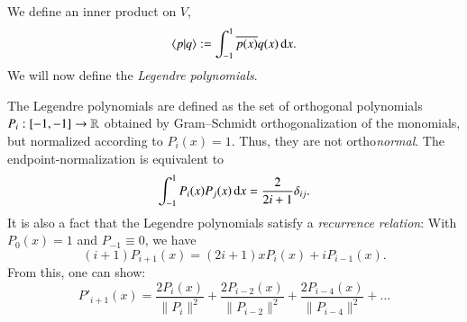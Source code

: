 \documentclass[12pt]{report}
\newenvironment{solution}%
        {%
            \ifthenelse{\isundefined{\showsolutions}}%
                    {\expandafter\comment}%
                    {\begin{mySolution}{}{}}%
                    }%
         {%
            \ifthenelse{\isundefined{\showsolutions}}%
                    {\expandafter\endcomment}%
                    {\end{mySolution}}%
          }
\begin{document}
We define an inner product on $V$,
\begin{equation}
    \braket{p|q} := \int_{-1}^1 \overline{p(x)} q(x) \, \mathrm{d} x.
\end{equation}
We will now define the \emph{Legendre polynomials}.
The Legendre polynomials  are defined as the set of orthogonal polynomials $P_i : [-1,-1]\to \mathbb{R}$ obtained by Gram--Schmidt orthogonalization of the monomials, but normalized according to $P_i(x) = 1$. Thus, they are not ortho\emph{normal}. The endpoint-normalization is equivalent to
\begin{equation}
    \int_{-1}^1 P_i(x) P_j(x) \, \mathrm{d} x = \frac{2}{2i + 1} \delta_{ij}.
\end{equation}
It is also a fact that the Legendre polynomials satisfy a \emph{recurrence relation}: With $P_0(x) = 1$ and $P_{-1} \equiv 0$, we have
\begin{equation}
    (i + 1) P_{i+1}(x) = (2i + 1) x P_i(x) + i P_{i-1}(x). 
\end{equation}
From this, one can show:
\begin{equation}
    P'_{i+1}(x) = \frac{2 P_i(x)}{\|P_i\|^2} + \frac{2 P_{i-2}(x)}{\|P_{i-2}\|^2} + \frac{2 P_{i-4}(x)}{\|P_{i-4}\|^2} + \ldots  \label{eq:legendrediff}
\end{equation}
\end{document}
